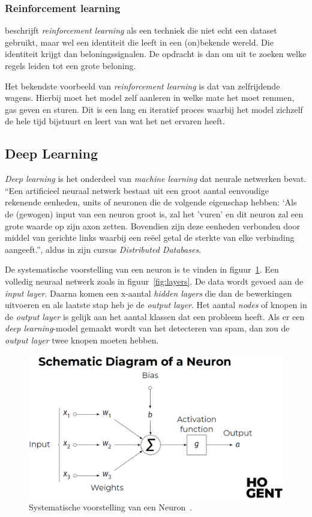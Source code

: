 \subsubsection{Reinforcement learning}
\textcite{Lievens2021} beschrijft \textit{reinforcement learning} als een techniek die niet echt een dataset gebruikt, maar wel een identiteit die leeft in een (on)bekende wereld. Die identiteit krijgt dan beloningssignalen. De opdracht is dan om uit te zoeken welke regels leiden tot een grote beloning.

Het bekendste voorbeeld van \textit{reinforcement learning} is dat van zelfrijdende wagens. Hierbij moet het model zelf aanleren in welke mate het moet remmen, gas geven en sturen. Dit is een lang en iteratief proces waarbij het model zichzelf de hele tijd bijstuurt en leert van wat het net ervaren heeft.

\subsection{Deep Learning}
\textit{Deep learning} is het onderdeel van \textit{machine learning} dat neurale netwerken bevat.
``Een artificieel neuraal netwerk bestaat uit een groot aantal eenvoudige rekenende eenheden, units of neuronen die de volgende eigenschap hebben: `Als de (gewogen) input van een neuron groot is, zal het 'vuren' en dit neuron zal een grote waarde op zijn axon zetten. Bovendien zijn deze eenheden verbonden door middel van gerichte links waarbij een reëel getal de sterkte van elke verbinding aangeeft.'', aldus \textcite{Lievens2021} in zijn cursus \textit{Distributed Databases}.

De systematische voorstelling van een neuron is te vinden in figuur~\ref{fig:neuron}.
Een volledig neuraal netwerk zoals in figuur~\ref{fig:layers}. De data wordt gevoed aan de \textit{input layer}. Daarna komen een x-aantal \textit{hidden layers} die dan de bewerkingen uitvoeren en als laatste stap heb je de \textit{output layer}. Het aantal \textit{nodes} of knopen in de \textit{output layer} is gelijk aan het aantal klassen dat een probleem heeft. Als er een \textit{deep learning}-model gemaakt wordt van het detecteren van spam, dan zou de \textit{output layer} twee knopen moeten hebben.

\begin{figure}
    \centering
    \includegraphics[width=1\textwidth]{./img/neuron}
    \caption{\label{fig:neuron} Systematische voorstelling van een Neuron~\autocite{Lievens2021}.}
\end{figure}

